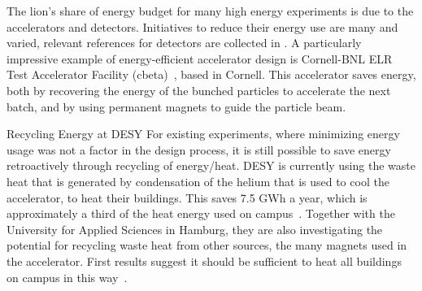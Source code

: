 \documentclass[../SustainableHEP.tex]{subfiles}
\begin{document}
The lion's share of energy budget for many high energy experiments is due to the accelerators and detectors. Initiatives to reduce their energy use are many and varied, relevant references for detectors are collected in .  A particularly impressive example of energy-efficient accelerator design is Cornell-BNL ELR Test Accelerator Facility (\acrshort{cbeta})~\cite{Bartnik:2020pos}, based in Cornell. This accelerator saves energy, both by recovering the energy of the bunched particles to accelerate the next batch, and by using permanent magnets to guide the particle beam.


\begin{bestpractice}{Recycling Energy at DESY}%
   For existing experiments, where minimizing energy usage was not a factor in the design process, it is still possible to save energy retroactively through recycling of energy/heat. DESY is currently using the waste heat that is generated by condensation of the helium that is used to cool the accelerator, to heat their buildings. This saves 7.5 GWh a year, which is approximately a third of the heat energy used on campus~\cite{DESY}. Together with the University for Applied Sciences in Hamburg, they are also investigating the potential for recycling waste heat from other sources, \eg the many magnets used in the accelerator. First results suggest it should be sufficient to heat all buildings on campus in this way~\cite{DESYsustainableReport2022}.
\end{bestpractice}
\end{document}

